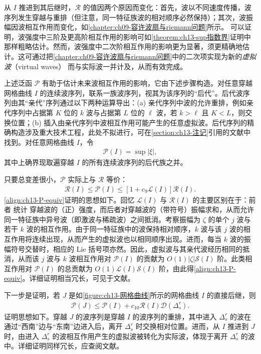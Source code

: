 \documentclass[../../main.tex]{subfiles}
\begin{document}
从 $I$ 推进到其后继时，$\mathscr{R}$ 的值因两个原因而变化：首先，波以不同速度传播，波序列发生穿越与重排（但注意，同一特征族波的相对顺序必然保持）；其次，波振幅因波相互作用而变化，如\cref{chapter:ch09-容许波扇与riemann问题}所示。
可以证明，波强度中三阶及更高阶相互作用的影响可如\cref{theorem:ch13-sup指数界}证明中那样粗略估计。然而，波强度中二次阶相互作用的影响更为显著，须更精确地估计。这可通过把\cref{chapter:ch09-容许波扇与riemann问题}中的二次项实现为新的\emph{虚拟波}（virtual waves）
而与实际波一并计及，从而有效完成。

上述泛函 $\mathscr{P}$ 有助于估计未来波相互作用的影响，它由下述步骤构造。对任意穿越网格曲线 $I$ 的连续波序列，联系一族波序列，视其为该序列的``后代''。后代波序列由其``亲代''序列通过以下两种运算导出：(a) 亲代序列中波的允许重排，例如亲代序列中占据第 $K$ 位的 $k$ 波与占据第 $L$ 位的 $\ell$ 波，若 $k>\ell$ 且 $K<L$，则交换位置；(b) 插入由亲代序列中波相互作用可能产生的任意虚拟波。后代序列的精确构造涉及重大技术工程，此处不拟进行，可在\cref{section:ch13-注记}引用的文献中找到。对任意网格曲线 $I$，令
\begin{align}
\mathscr{P}(I)=\sup|\xi|,
\label{align:ch13-P-def}
\end{align}
其中上确界现取遍穿越 $I$ 的所有连续波序列的后代族之并。

只要总变差很小，$\mathscr{P}$ 实际上与 $\mathscr{R}$ 等价：
\begin{align}
\mathscr{R}(I)\leqslant\mathscr{P}(I)\leqslant[1+c_9\mathscr{L}(I)]\mathscr{R}(I).
\label{align:ch13-P-equiv}
\end{align}
\eqref{align:ch13-P-equiv}证明的思想如下。回忆 $\mathscr{L}(I)$ 与 $\mathscr{R}(I)$ 的主要区别在于：前者 统计 穿越波的（正）强度，而后者对穿越波的（带符号）振幅求和，从而允许同一特征族中异号波（即激波与稀疏波）之间抵消。考察振幅为 $\zeta$ 的单个 $j$ 波与若干 $k$ 波的相互作用。由于同一特征族中的波保持相对顺序，$k$ 波与该 $j$ 波的相互作用将连续出现，从而产生的虚拟波也以相同顺序出现。进而，每当 $k$ 波的振幅符号交替时，相应的 Lie 括号项亦然。因此，虚拟波与其亲代波经历相同的抵消，从而该 $j$ 波与 $k$ 波相互作用对 $\mathscr{P}(I)$ 的贡献为 $O(1)|\zeta|\mathscr{S}(I)$ 阶。此类相互作用对 $\mathscr{P}(I)$ 的总贡献为 $O(1)\mathscr{L}(I)\mathscr{S}(I)$ 阶，由此得\eqref{align:ch13-P-equiv}。详细证明相当冗长，可见于文献。

下一步是证明，若 $J$ 是如\cref{figure:ch13-网格曲线}所示的网格曲线 $I$ 的直接后继，则
\begin{align}
\mathscr{P}(J)\leqslant\mathscr{P}(I)+c_{10}\mathscr{R}(I)\mathscr{D}(\Delta_s^r).
\label{align:ch13-P-change}
\end{align}
证明思想如下。穿越 $J$ 的波序列是穿越 $I$ 的波序列的重排，其中进入 $\Delta_s^r$ 的波在通过``西南''边与``东南''边进入后，离开 $\Delta_s^r$ 时交换相对位置。进而，从 $I$ 推进到 $J$ 时，由进入 $\Delta_s^r$ 的波相互作用产生的虚拟波被转化为实际波，体现于离开 $\Delta_s^r$ 的波中。详细证明同样冗长，应查阅文献。
\end{document}

